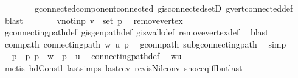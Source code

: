 \begin{isabellebody}
\ \ \ \ \ \ \ \ g{\isacharprime}{\kern0pt}{\isachardot}{\kern0pt}connected{\isacharunderscore}{\kern0pt}component{\isacharunderscore}{\kern0pt}connected\ g{\isacharprime}{\kern0pt}{\isachardot}{\kern0pt}is{\isacharunderscore}{\kern0pt}connected{\isacharunderscore}{\kern0pt}setD\ g{\isacharprime}{\kern0pt}{\isachardot}{\kern0pt}vert{\isacharunderscore}{\kern0pt}connected{\isacharunderscore}{\kern0pt}def\ \isamarkupfalse%
\ blast\isanewline
\ \ \ \ \isamarkupfalse%
\ \isamarkupfalse%
\ v{\isacharunderscore}{\kern0pt}notin{\isacharunderscore}{\kern0pt}p{\isacharcolon}{\kern0pt}\ {\isachardoublequoteopen}v\ {\isasymnotin}\ set\ p{\isachardoublequoteclose}\ \isamarkupfalse%
\ remove{\isacharunderscore}{\kern0pt}vertex\ \isamarkupfalse%
\ g{\isacharprime}{\kern0pt}{\isachardot}{\kern0pt}connecting{\isacharunderscore}{\kern0pt}path{\isacharunderscore}{\kern0pt}def\ g{\isacharprime}{\kern0pt}{\isachardot}{\kern0pt}is{\isacharunderscore}{\kern0pt}gen{\isacharunderscore}{\kern0pt}path{\isacharunderscore}{\kern0pt}def\ g{\isacharprime}{\kern0pt}{\isachardot}{\kern0pt}is{\isacharunderscore}{\kern0pt}walk{\isacharunderscore}{\kern0pt}def\ remove{\isacharunderscore}{\kern0pt}vertex{\isacharunderscore}{\kern0pt}def\ \isamarkupfalse%
\ blast\isanewline
\ \ \ \ \isamarkupfalse%
\ conn{\isacharunderscore}{\kern0pt}path{\isacharcolon}{\kern0pt}\ {\isachardoublequoteopen}connecting{\isacharunderscore}{\kern0pt}path\ w\ u\ p{\isachardoublequoteclose}\ \isamarkupfalse%
\ g{\isacharprime}{\kern0pt}{\isacharunderscore}{\kern0pt}conn{\isacharunderscore}{\kern0pt}path\ subg{\isachardot}{\kern0pt}connecting{\isacharunderscore}{\kern0pt}path\ \isamarkupfalse%
\ simp\isanewline
\ \ \ \ \isamarkupfalse%
\ \isamarkupfalse%
\ p{\isacharprime}{\kern0pt}\ \ p{\isacharcolon}{\kern0pt}\ {\isachardoublequoteopen}p\ {\isacharequal}{\kern0pt}\ w\ {\isacharhash}{\kern0pt}\ p{\isacharprime}{\kern0pt}\ {\isacharat}{\kern0pt}\ {\isacharbrackleft}{\kern0pt}u{\isacharbrackright}{\kern0pt}{\isachardoublequoteclose}\ \isamarkupfalse%
\ connecting{\isacharunderscore}{\kern0pt}path{\isacharunderscore}{\kern0pt}def\ \isamarkupfalse%
\ {\isacartoucheopen}w{\isasymnoteq}u{\isacartoucheclose}\isanewline
\ \ \ \ \ \ \isamarkupfalse%
\ {\isacharparenleft}{\kern0pt}metis\ hd{\isacharunderscore}{\kern0pt}Cons{\isacharunderscore}{\kern0pt}tl\ last{\isachardot}{\kern0pt}simps\ last{\isacharunderscore}{\kern0pt}rev\ rev{\isacharunderscore}{\kern0pt}is{\isacharunderscore}{\kern0pt}Nil{\isacharunderscore}{\kern0pt}conv\ snoc{\isacharunderscore}{\kern0pt}eq{\isacharunderscore}{\kern0pt}iff{\isacharunderscore}{\kern0pt}butlast{\isacharparenright}{\kern0pt}\isanewline

\end{isabellebody}
